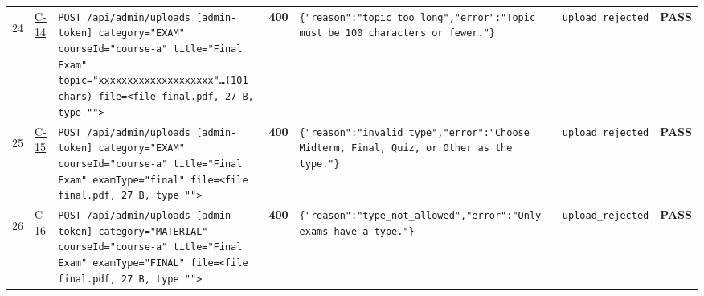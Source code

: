 \documentclass[10pt,a4paper]{article}
\begin{document}
\begin{landscape}
\begin{longtable}{@{}P{0.6cm}P{0.9cm}P{8.5cm}P{1.0cm}P{6.2cm}P{4.2cm}P{1.1cm}@{}}
\hypertarget{call24}{24} & \hyperlink{test-C-14}{C-14} & \texttt{POST /\allowbreak{}api/\allowbreak{}admin/\allowbreak{}uploads [admin-\allowbreak{}token] category=\allowbreak{}"\allowbreak{}EXAM"\allowbreak{} courseId=\allowbreak{}"\allowbreak{}course-\allowbreak{}a"\allowbreak{} title=\allowbreak{}"\allowbreak{}Final Exam"\allowbreak{} topic=\allowbreak{}"\allowbreak{}xxxxxxxxxxxxxxxxxx\allowbreak{}xx"\allowbreak{}…(101 chars) file=\allowbreak{}<file final.\allowbreak{}pdf,\allowbreak{} 27 B,\allowbreak{} type "\allowbreak{}"\allowbreak{}>} & \textcolor{warnamber}{\textbf{400}} & \texttt{\{"\allowbreak{}reason"\allowbreak{}:\allowbreak{}"\allowbreak{}topic\_\allowbreak{}too\_\allowbreak{}long"\allowbreak{},\allowbreak{}"\allowbreak{}error"\allowbreak{}:\allowbreak{}"\allowbreak{}Topic must be 100 characters or fewer.\allowbreak{}"\allowbreak{}\}} & \texttt{upload\_\allowbreak{}rejected} & \textcolor{passgreen}{\textbf{PASS}} \\
\hypertarget{call25}{25} & \hyperlink{test-C-15}{C-15} & \texttt{POST /\allowbreak{}api/\allowbreak{}admin/\allowbreak{}uploads [admin-\allowbreak{}token] category=\allowbreak{}"\allowbreak{}EXAM"\allowbreak{} courseId=\allowbreak{}"\allowbreak{}course-\allowbreak{}a"\allowbreak{} title=\allowbreak{}"\allowbreak{}Final Exam"\allowbreak{} examType=\allowbreak{}"\allowbreak{}final"\allowbreak{} file=\allowbreak{}<file final.\allowbreak{}pdf,\allowbreak{} 27 B,\allowbreak{} type "\allowbreak{}"\allowbreak{}>} & \textcolor{warnamber}{\textbf{400}} & \texttt{\{"\allowbreak{}reason"\allowbreak{}:\allowbreak{}"\allowbreak{}invalid\_\allowbreak{}type"\allowbreak{},\allowbreak{}"\allowbreak{}error"\allowbreak{}:\allowbreak{}"\allowbreak{}Choose Midterm,\allowbreak{} Final,\allowbreak{} Quiz,\allowbreak{} or Other as the type.\allowbreak{}"\allowbreak{}\}} & \texttt{upload\_\allowbreak{}rejected} & \textcolor{passgreen}{\textbf{PASS}} \\
\hypertarget{call26}{26} & \hyperlink{test-C-16}{C-16} & \texttt{POST /\allowbreak{}api/\allowbreak{}admin/\allowbreak{}uploads [admin-\allowbreak{}token] category=\allowbreak{}"\allowbreak{}MATERIAL"\allowbreak{} courseId=\allowbreak{}"\allowbreak{}course-\allowbreak{}a"\allowbreak{} title=\allowbreak{}"\allowbreak{}Final Exam"\allowbreak{} examType=\allowbreak{}"\allowbreak{}FINAL"\allowbreak{} file=\allowbreak{}<file final.\allowbreak{}pdf,\allowbreak{} 27 B,\allowbreak{} type "\allowbreak{}"\allowbreak{}>} & \textcolor{warnamber}{\textbf{400}} & \texttt{\{"\allowbreak{}reason"\allowbreak{}:\allowbreak{}"\allowbreak{}type\_\allowbreak{}not\_\allowbreak{}allowed"\allowbreak{},\allowbreak{}"\allowbreak{}error"\allowbreak{}:\allowbreak{}"\allowbreak{}Only exams have a type.\allowbreak{}"\allowbreak{}\}} & \texttt{upload\_\allowbreak{}rejected} & \textcolor{passgreen}{\textbf{PASS}} \\

\end{longtable}
\end{landscape}
\end{document}
